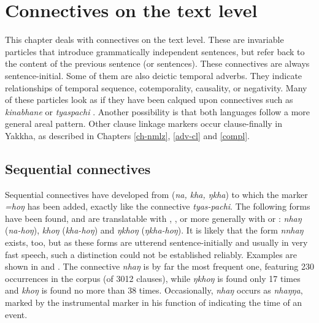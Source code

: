 ﻿\chapter{Connectives on the text level}\label{clink-rest}


This chapter deals with connectives on the text level. These are invariable particles that introduce grammatically independent sentences, but refer back to the content of the previous sentence (or sentences).  These connectives are always sentence-initial. Some of them are also deictic temporal adverbs. They indicate relationships of temporal sequence, cotemporality, causality, or negativity. Many of these particles look as if they have been calqued upon  connectives such as  \emph{kinabhane}  or \emph{tyaspachi} . Another possibility is that both languages follow a more general areal pattern. Other  clause linkage markers occur clause-finally in Yakkha, as described in Chapters  \ref{ch-nmlz}, \ref{adv-cl} and \ref{compl}.

\section{Sequential connectives}

Sequential connectives have developed from  (\emph{na, kha, ŋkha}) to which  the  marker \emph{=hoŋ} 
has been added, exactly like the  connective \emph{tyas-pachi}. The following forms have been found, and are translatable with , , or more generally with  or : \emph{nhaŋ} (\emph{na-hoŋ}), \emph{khoŋ} (\emph{kha-hoŋ}) and \emph{ŋkhoŋ} (\emph{ŋkha-hoŋ}). It is likely that the form \emph{nnhaŋ} exists, too, but as these forms are utterend sentence-initially and usually in very fast speech, such a distinction could not be established reliably. Examples are shown in  \Next and \NNext. The connective \emph{nhaŋ} is by far the most frequent one, featuring 230 occurrences in the corpus (of 3012 clauses), while \emph{ŋkhoŋ} is found only 17 times and \emph{khoŋ} is found no more than 38 times. Occasionally, \emph{nhaŋ} occurs as \emph{nhaŋŋa}, marked by the instrumental marker in his function of indicating the time of an event.

